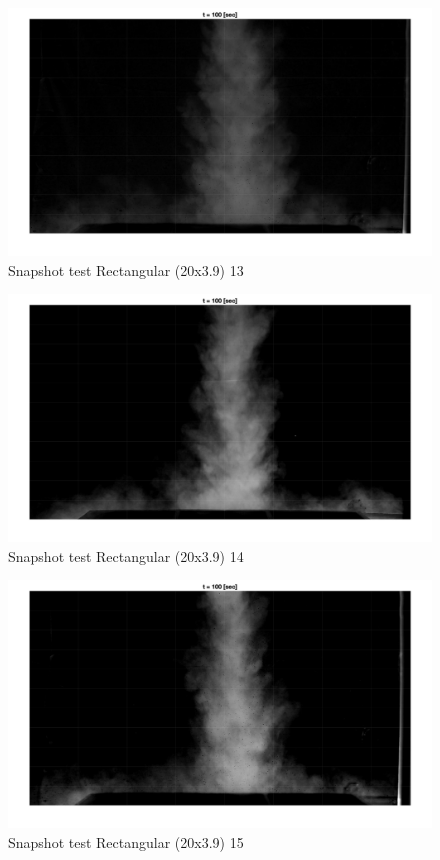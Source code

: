 \begin{figure}[ht!]
    \centering
    \includegraphics[width=\linewidth]{Images/Rec20_13_t100.jpg}
    \caption{Snapshot test Rectangular (20x3.9) 13}
\end{figure}

\begin{figure}[ht!]
    \centering
    \includegraphics[width=\linewidth]{Images/Rec20_14_t100.jpg}
    \caption{Snapshot test Rectangular (20x3.9) 14}
\end{figure}

\begin{figure}[ht!]
    \centering
    \includegraphics[width=\linewidth]{Images/Rec20_15_t100.jpg}
    \caption{Snapshot test Rectangular (20x3.9) 15}
\end{figure}

